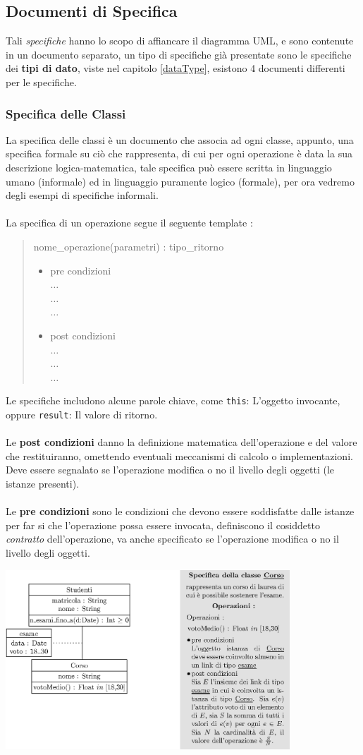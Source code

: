 \documentclass[12pt, letterpaper]{article}
\newcommand{\code}[1]{\colorbox{light-gray}{\texttt{#1}}}
\newcommand{\acc}{\\\hphantom{}\\}
\begin{document}
\subsection{Documenti di Specifica}
Tali \textit{specifiche} hanno lo scopo di affiancare il diagramma UML, e sono contenute in un documento separato, un tipo
di specifiche già presentate sono le specifiche dei \textbf{tipi di dato}, viste nel capitolo \ref{dataType}, esistono
4 documenti differenti per le specifiche.
\subsubsection{Specifica delle Classi}
La specifica delle classi è un documento che associa ad ogni classe, appunto, una specifica formale su ciò che rappresenta, di cui
per ogni operazione è data la sua descrizione logica-matematica, tale specifica può essere scritta in linguaggio
umano (informale) ed in linguaggio puramente logico (formale), per ora vedremo degli esempi di specifiche
informali.\acc
La specifica di un operazione segue il seguente template : \begin{quote}
    nome\_operazione(parametri) : tipo\_ritorno\begin{itemize}
        \item pre condizioni  \\\(\dots\)\\\(\dots\)\\\(\dots\)
        \item post condizioni  \\\(\dots\)\\\(\dots\)\\\(\dots\)
    \end{itemize}
\end{quote}
Le specifiche includono alcune parole chiave, come \code{this}: L'oggetto invocante, oppure
\code{result}: Il valore di ritorno.\acc
Le \textbf{post condizioni} danno la definizione matematica dell'operazione e del valore che restituiranno,
omettendo eventuali meccanismi di calcolo o implementazioni. Deve essere segnalato se l'operazione
modifica o no il livello degli oggetti (le istanze presenti).\acc Le \textbf{pre condizioni} sono le condizioni
che devono essere soddisfatte dalle istanze per far si che l'operazione possa essere
invocata, definiscono il cosiddetto \textit{contratto} dell'operazione, va anche specificato se l'operazione
modifica o no il livello degli oggetti.\begin{center}
    \includegraphics[width=0.8\textwidth ]{images/specificaClassi.eps}
\end{center}
\end{document}
